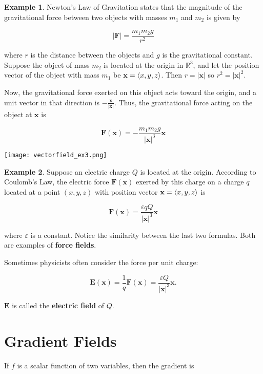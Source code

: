 \documentclass[11pt,oneside,english]{amsart}
\theoremstyle{definition}
\newtheorem*{example}{Example}
\newcommand{\R}{\mathbb{R}}
\def\<#1>{\mathinner{\langle#1\rangle}}
\begin{document}
\begin{example}
Newton's Law of Gravitation states that the magnitude of the gravitational force between two objects with masses $m_1$ and $m_2$ is given by

\[
|\mathbf{F}|=\frac{m_1m_2g}{r^2}
\]

where $r$ is the distance between the objects and $g$ is the gravitational constant. Suppose the object of mass $m_2$ is located at the origin in $\R^3$, and let the position vector of the object with mass $m_1$ be $\mathbf{x}=\<x,y,z>$. Then $r=|\mathbf{x}|$ so $r^2=|\mathbf{x}|^2$.

Now, the gravitational force exerted on this object acts toward the origin, and a unit vector in that direction is $-\frac{\mathbf{x}}{|\mathbf{x}|}$. Thus, the gravitational force acting on the object at $\mathbf{x}$ is

\[
\mathbf{F}(\mathbf{x})=-\frac{m_1m_2g}{|\mathbf{x}|^3}\mathbf{x}
\]

\begin{center}
\texttt{[image: vectorfield\_ex3.png]}
\end{center}
\end{example}


\begin{example}
Suppose an electric charge $Q$ is located at the origin. According to Coulomb's Law, the electric force $\mathbf{F}(\mathbf{x})$ exerted by this charge on a charge $q$ located at a point $(x,y,z)$ with position vector $\mathbf{x}=\<x,y,z>$ is

\[
\mathbf{F}(\mathbf{x})=\frac{\varepsilon qQ}{|\mathbf{x}|^3}\mathbf{x}
\]

where $\varepsilon$ is a constant. Notice the similarity between the last two formulas. Both are examples of \textbf{force fields}.

Sometimes physicists often consider the force per unit charge:

\[
\mathbf{E}(\mathbf{x})=\frac{1}{q}\mathbf{F}(\mathbf{x})=\frac{\varepsilon Q}{|\mathbf{x}|^3}\mathbf{x}.
\]

$\mathbf{E}$ is called the \textbf{electric field} of $Q$.
\end{example}




\section*{Gradient Fields}

If $f$ is a scalar function of two variables, then the gradient is
\end{document}
